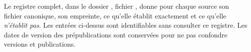 Le registre complet, dans le dossier , fichier
, donne pour
chaque source son fichier canonique, son empreinte, ce qu'elle établit
exactement et ce qu'elle \emph{n'établit pas}. Les entrées ci-dessus sont
identifiables sans consulter ce registre. Les dates de version des
prépublications sont conservées pour ne pas confondre versions et publications.
\endgroup
